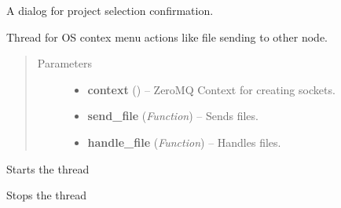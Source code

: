 \documentclass[letterpaper,10pt,english]{sphinxmanual}
\begin{document}

\begin{fulllineitems}
\label{wos:wos.ProjectSelectedDialog}
A dialog for project selection confirmation.

\end{fulllineitems}


\begin{fulllineitems}
\label{wos:wos.SEND_FILE_CONTEX_MENU_HANDLER}
Thread for OS contex menu actions like file sending to other node.
\begin{quote}\begin{description}
\item[{Parameters}] \leavevmode\begin{itemize}
\item {} 
\textbf{context} () -- ZeroMQ Context for creating sockets.

\item {} 
\textbf{send\_file} (\emph{Function}) -- Sends files.

\item {} 
\textbf{handle\_file} (\emph{Function}) -- Handles files.

\end{itemize}

\end{description}\end{quote}

\begin{fulllineitems}
\label{wos:wos.SEND_FILE_CONTEX_MENU_HANDLER.run}
Starts the thread

\end{fulllineitems}


\begin{fulllineitems}
\label{wos:wos.SEND_FILE_CONTEX_MENU_HANDLER.stop}
Stops the thread

\end{fulllineitems}


\end{fulllineitems}
\end{document}
